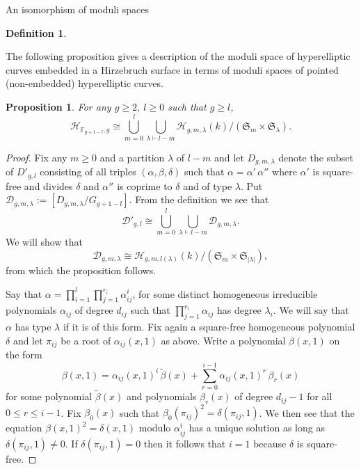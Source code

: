 \documentclass[10pt,a4paper,twoside]{amsart}
\theoremstyle{plain}
\newtheorem{prop}[theo]{Proposition}
\theoremstyle{definition}
\newtheorem{defin}{Definition}
\theoremstyle{remark}
\begin{document}
\begin{subsection}{An isomorphism of moduli spaces}
\begin{defin}
\end{defin}

The following proposition gives a description of the moduli space of hyperelliptic curves embedded in a Hirzebruch surface in terms of moduli spaces of pointed (non-embedded) hyperelliptic curves.

\begin{prop} \label{prop-moduli} For any $g \geq 2$, $l \geq 0$ such that $g \geq l$, 
\begin{equation}\label{eq3}
    \mathcal{H}_{\mathbb{F}_{g+1-l},g} \cong \bigcup_{m=0}^l \bigcup_{\lambda \vdash l-m} \mathcal H_{g,m,\lambda}(k)/(\mathfrak S_m \times \mathfrak S_{\lambda}).
\end{equation}
\end{prop}
\begin{proof}

Fix any $m \geq 0$ and a partition $\lambda$ of $l-m$ and let $D_{g,m,\lambda}$ denote the subset of $D'_{g,l}$ consisting of all triples $(\alpha,\beta,\delta)$ such that $\alpha=\alpha' \, \alpha''$ where $\alpha'$ is square-free and divides $\delta$ and $\alpha''$ is coprime to $\delta$ and of type $\lambda$. Put $\mathcal{D}_{g,m,\lambda}:=[D_{g,m,\lambda}/G_{g+1-l}]$. From the definition we see that 
\[
\mathcal{D}'_{g,l} \cong \bigcup_{m=0}^l \bigcup_{\lambda \vdash l-m} \mathcal{D}_{g,m,\lambda}.
\]
We will show that 
\begin{equation}\label{eq2}
    \mathcal{D}_{g,m,\lambda} \cong \mathcal H_{g,m,l(\lambda)}(k)/(\mathfrak S_m \times \mathfrak S_{|\lambda|}),
\end{equation}
from which the proposition follows. 

Say that $\alpha=\prod_{i=1}^l \prod_{j=1}^{r_i} \alpha_{ij}^i$, for some distinct homogeneous irreducible polynomials $\alpha_{ij}$ of degree $d_{ij}$ such that $\prod_{j=1}^{r_i} \alpha_{ij}$ has degree $\lambda_i$. We will say that $\alpha$ has type $\lambda$ if it is of this form. Fix again a square-free homogeneous polynomial $\delta$ and let $\pi_{ij}$ be a root of $\alpha_{ij}(x,1)$ as above. Write a polynomial $\beta(x,1)$ on the form 
\[
\beta(x,1)=\alpha_{ij}(x,1)^i\, \tilde \beta(x)+\sum_{r=0}^{i-1} \alpha_{ij}(x,1)^r \, \beta_r(x)  
\]
for some polynomial $\tilde \beta(x)$ and polynomials $\beta_r(x)$ of degree $d_{ij}-1$ for all $0 \leq r \leq i-1$. Fix $\beta_0(x)$ such that $\beta_0(\pi_{ij})^2=\delta(\pi_{ij},1)$. We then see that the equation $\beta(x,1)^2=\delta(x,1)$ modulo $\alpha_{ij}^i$ has a unique solution as long as $\delta(\pi_{ij},1) \neq 0$. If $\delta(\pi_{ij},1)=0$ then it follows that $i=1$ because $\delta$ is square-free. 
\end{proof}


\end{subsection}
\end{document}
